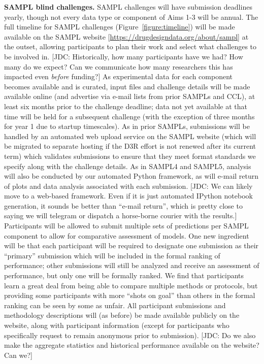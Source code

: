 \documentclass[11pt]{article}
\begin{document}
{\bf SAMPL blind challenges.} SAMPL challenges will have submission deadlines yearly, though not every data type or component of Aims 1-3 will be annual.
The full timeline for SAMPL challenges (Figure~\ref{figure:timeline}) will be made available on the SAMPL website [\url{https://drugdesigndata.org/about/sampl}] at the outset, allowing participants to plan their work and select what challenges to be involved in.
{\color{red}[JDC: Historically, how many participants have we had? How many do we expect? Can we communicate how many researchers this has impacted even \emph{before} funding?]}
As experimental data for each component becomes available and is curated, input files and challenge details will be made available online (and advertise via e-mail lists from prior SAMPLs and CCL), at least six months prior to the challenge deadline; data not yet available at that time will be held for a subsequent challenge (with the exception of three months for year 1 due to startup timescales).
As in prior SAMPLs, submissions will be handled by an automated web upload service on the SAMPL website (which will be migrated to separate hosting if the D3R effort is not renewed after its current term) which validates submissions to ensure that they meet format standards we specify along with the challenge details. 
As in SAMPL4 and SAMPL5, analysis will also be conducted by our automated Python framework, as will e-mail return of plots and data analysis associated with each submission.
{\color{red}[JDC: We can likely move to a web-based framework. Even if it is just automated IPython notebook generation, it sounds be better than ``e-mail return'', which is pretty close to saying we will telegram or dispatch a horse-borne courier with the results.]}
Participants will be allowed to submit multiple sets of predictions per SAMPL component to allow for comparative assessment of models.
One new ingredient will be that each participant will be required to designate one submission as their ``primary'' submission which will be included in the formal ranking of performance; other submissions will still be analyzed and receive an assessment of performance, but only one will be formally ranked.
We find that participants learn a great deal from being able to compare multiple methods or protocols, but providing some participants with more ``shots on goal'' than others in the formal ranking can be seen by some as unfair.
All participant submissions and methodology descriptions will (as before) be made available publicly on the website, along with participant information (except for participants who specifically request to remain anonymous prior to submission).
{\color{red}[JDC: Do we also make the aggregate statistics and historical performance available on the website? Can we?]}
\end{document}
